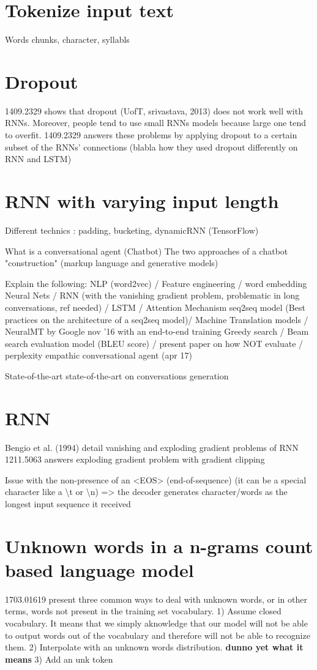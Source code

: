\section{Tokenize input text}
Words chunks, character, syllabls

\section{Dropout}
1409.2329 shows that dropout (UofT, srivastava, 2013) does not work well with RNNs. Moreover, people tend to use small RNNs models because large one tend to overfit. 1409.2329 answers these problems by applying dropout to a certain subset of the RNNs' connections (blabla how they used dropout differently on RNN and LSTM)

\section{RNN with varying input length}
Different technics : padding, bucketing, dynamicRNN (TensorFlow)

What is a conversational agent (Chatbot)
The two approaches of a chatbot "construction" (markup language and generative models)

Explain the following:
NLP (word2vec) / Feature engineering / word embedding
Neural Nets / RNN (with the vanishing gradient problem, problematic in long conversations, ref needed) / LSTM / Attention Mechanism
seq2seq model (Best practices on the architecture of a seq2seq model)/ Machine Translation models / NeuralMT by Google nov '16 with an end-to-end training
Greedy search / Beam search
evaluation model (BLEU score) / present paper on how NOT evaluate / perplexity
empathic conversational agent (apr 17)

State-of-the-art
state-of-the-art on conversations generation

\section{RNN}
Bengio et al. (1994) detail vanishing and exploding gradient problems of RNN
1211.5063 answers exploding gradient problem with gradient clipping


Issue with the non-presence of an <EOS> (end-of-sequence) (it can be a special character like a \textbackslash t or \textbackslash n) => the decoder generates character/words as the longest input sequence it received

\section{Unknown words in a n-grams count based language model}
1703.01619 present three common ways to deal with unknown words, or in other terms, words not present in the training set vocabulary. 1) Assume closed vocabulary. It means that we simply aknowledge that our model will not be able to output words out of the vocabulary and therefore will not be able to recognize them. 2) Interpolate with an unknown words distribution. \textbf{dunno yet what it means} 3) Add an unk token \citep{1703.01619}

